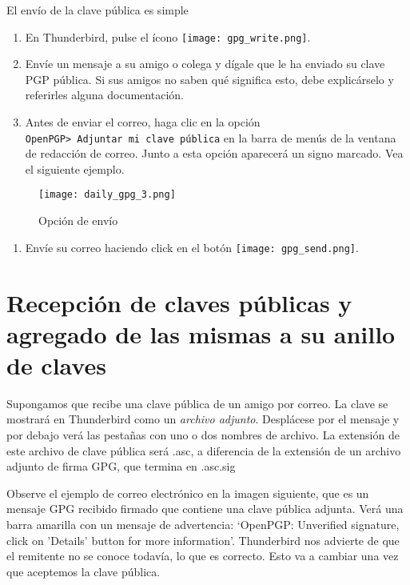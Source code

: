 \documentclass[10pt,a5paper,twoside,,]{book}
\providecommand{\tightlist}{%
  \setlength{\itemsep}{0pt}\setlength{\parskip}{0pt}}
\begin{document}
El envío de la clave pública es simple

\begin{enumerate}
\def\labelenumi{\arabic{enumi}.}
\item
  En Thunderbird, pulse el ícono \texttt{[image: gpg\_write.png]}.
\item
  Envíe un mensaje a su amigo o colega y dígale que le ha enviado su
  clave PGP pública. Si sus amigos no saben qué significa esto, debe
  explicárselo y referirles alguna documentación.
\item
  Antes de enviar el correo, haga clic en la opción
  \texttt{OpenPGP\textgreater{}\ Adjuntar\ mi\ clave\ pública} en la
  barra de menús de la ventana de redacción de correo. Junto a esta
  opción aparecerá un signo marcado. Vea el siguiente ejemplo.
\end{enumerate}

\begin{figure}[htbp]
\centering
\texttt{[image: daily\_gpg\_3.png]}
\caption{Opción de envío}
\end{figure}

\begin{enumerate}
\def\labelenumi{\arabic{enumi}.}
\setcounter{enumi}{3}
\tightlist
\item
  Envíe su correo haciendo click en el botón
  \texttt{[image: gpg\_send.png]}.
\end{enumerate}

\section{Recepción de claves públicas y agregado de las mismas a su
anillo de
claves}\label{recepciuxf3n-de-claves-puxfablicas-y-agregado-de-las-mismas-a-su-anillo-de-claves}

Supongamos que recibe una clave pública de un amigo por correo. La clave
se mostrará en Thunderbird como un \emph{archivo adjunto}. Desplácese
por el mensaje y por debajo verá las pestañas con uno o dos nombres de
archivo. La extensión de este archivo de clave pública será .asc, a
diferencia de la extensión de un archivo adjunto de firma GPG, que
termina en .asc.sig

Observe el ejemplo de correo electrónico en la imagen siguiente, que es
un mensaje GPG recibido firmado que contiene una clave pública adjunta.
Verá una barra amarilla con un mensaje de advertencia: `OpenPGP:
Unverified signature, click on 'Details' button for more information'.
Thunderbird nos advierte de que el remitente no se conoce todavía, lo
que es correcto. Esto va a cambiar una vez que aceptemos la clave
pública.
\end{document}
